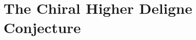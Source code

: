 
\providecommand{\SCchtop}{\mathsf{SC}^{\mathrm{ch},\mathrm{top}}}
\providecommand{\SCchtopKos}{\mathsf{SC}^{\mathrm{ch},\mathrm{top},!}}
\providecommand{\Fact}{\mathrm{Fact}}
\providecommand{\CoFact}{\mathrm{CoFact}}
\providecommand{\FM}{\mathrm{FM}}
\providecommand{\Conf}{\mathrm{Conf}}
\providecommand{\Ran}{\mathrm{Ran}}
\providecommand{\Obs}{\mathsf{Obs}}
\providecommand{\Hoch}{\mathrm{Hoch}}
\providecommand{\ChirHoch}{\mathrm{ChirHoch}}
\providecommand{\Bulk}{\mathrm{Bulk}}
\providecommand{\Bdy}{\mathrm{Bdy}}
\providecommand{\MC}{\mathrm{MC}}
\providecommand{\QME}{\mathrm{QME}}
\providecommand{\End}{\mathrm{End}}
\providecommand{\Mod}{\mathrm{Mod}}
\providecommand{\id}{\mathrm{id}}
\providecommand{\cA}{\mathcal{A}}
\providecommand{\cB}{\mathcal{B}}
\providecommand{\cC}{\mathcal{C}}
\providecommand{\cE}{\mathcal{E}}
\providecommand{\cF}{\mathcal{F}}
\providecommand{\cO}{\mathcal{O}}
\providecommand{\cZ}{\mathcal{Z}}
\providecommand{\cM}{\mathcal{M}}
\providecommand{\fg}{\mathfrak{g}}
\providecommand{\Lie}{\mathsf{Lie}}
\providecommand{\Ass}{\mathsf{Ass}}
\providecommand{\Com}{\mathsf{Com}}
\providecommand{\Free}{\mathrm{Free}}
\providecommand{\RHom}{\mathbf{R}\mathrm{Hom}}
\providecommand{\Barch}{\mathrm{B}^{\mathrm{ch}}}
\providecommand{\Cobarch}{\Omega^{\mathrm{ch}}}
\providecommand{\ChirAss}{\mathsf{ChirAss}}

\chapter{The Chiral Higher Deligne Conjecture}
\label{ch:chiral-higher-deligne}

